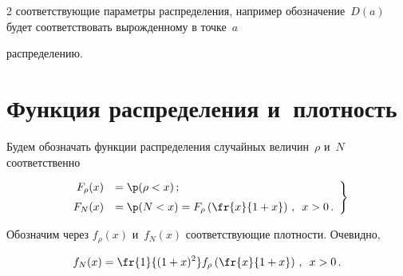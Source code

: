 \begin{multicols}{2}
соответствующие параметры распределения, например обозначение~$D(a)$ будет соответствовать вырожденному в точке~$a$


распределению.





\section{Функция распределения и~плотность}





Будем обозначать функции распределения случайных величин~$\rho$ и~$N$ соответственно


\begin{equation}


\left.


\begin{array}{rl}


F_\rho(x)&=\p(\rho<x)\,;\\[6pt]


 F_N(x)&=\p(N<x)=F_\rho\left( \fr{x}{1+x}\right)\,,\enskip x>0\,.


 \end{array}


 \right \}


\label{e1sh}


\end{equation}


Обозначим через $f_\rho(x)$ и~$f_N(x)$ соответствующие плотности. Очевидно,


\begin{equation}


f_N(x)=\fr{1}{(1+x)^2}f_\rho\left(\fr{x}{1+x}\right)\,,\enskip x>0\,.


\label{e2sh}


\end{equation}





\begin{table}\small


\begin{center}




\vspace*{2ex}






\end{center}
\end{table}
\end{multicols}
